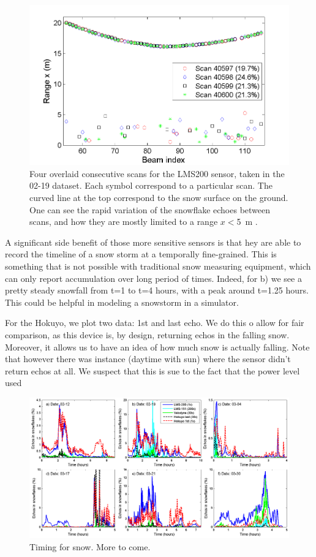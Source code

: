 \begin{figure}[th]
    \centering
    \includegraphics[width=0.95\linewidth]{./img/LMS200_4Scans_Feb19.png}
    \caption{Four overlaid consecutive scans for the LMS200 sensor, taken in the 02-19 dataset. Each symbol correspond to a particular scan. The curved line at the top correspond to the snow surface on the ground. One can see the rapid variation of the snowflake echoes between scans, and how they are mostly limited to a range $x<$\SI{5}{\meter} .}
    \label{fig:LMS200_4Scans_Feb19}
\end{figure}


A significant side benefit of those more sensitive sensors is that hey are able to record the timeline of a snow storm at a temporally fine-grained. This is something that is not possible with traditional snow measuring equipment, which can only report accumulation over long period of times. Indeed, for b) we see a pretty steady snowfall from t=1 to t=4 hours, with a peak around t=1.25 hours. This could be helpful in modeling a snowstorm in a simulator. 



For the Hokuyo, we plot two data: 1st and last echo. We do this o allow for fair comparison, as this device is, by design, returning echos in the falling snow. Moreover, it allows us to have an idea of how much  snow is actually falling. Note that however there was instance (daytime with sun) where the sensor didn't return  echos at all. We suspect that this is sue to the fact that the power level used

\begin{figure}[th]
    \centering
    \includegraphics[width=0.98\linewidth]{./img/TimingSnow.png}
    \caption{Timing for snow. More to come.}
    \label{fig:TimingSnow}
\end{figure}


